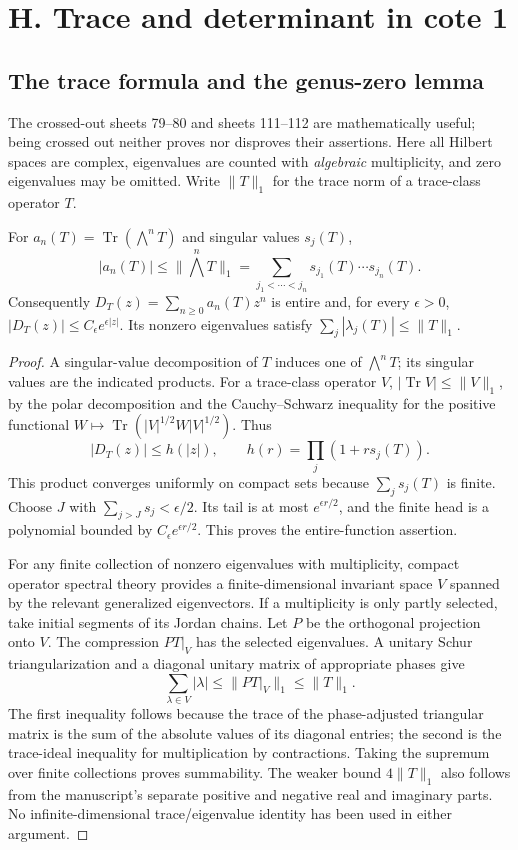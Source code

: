 \section{H. Trace and determinant in cote 1}
\label{sec:geometry-H}

\subsection{The trace formula and the genus-zero lemma}
The crossed-out sheets 79--80 and sheets 111--112 are mathematically useful;
being crossed out neither proves nor disproves their assertions. Here all
Hilbert spaces are complex, eigenvalues are counted with \emph{algebraic}
multiplicity, and zero eigenvalues may be omitted. Write $\|T\|_1$ for the
trace norm of a trace-class operator $T$.

\begin{lemma}
\label{geo-H-bounds}
For $a_n(T)=\operatorname{Tr}(\bigwedge^nT)$ and singular values $s_j(T)$,
\[
 |a_n(T)|\leq\|\bigwedge^nT\|_1
   =\sum_{j_1<\cdots<j_n}s_{j_1}(T)\cdots s_{j_n}(T).
\]
Consequently $D_T(z)=\sum_{n\geq0}a_n(T)z^n$ is entire and, for every
$\epsilon>0$, $|D_T(z)|\leq C_\epsilon e^{\epsilon|z|}$. Its nonzero
eigenvalues satisfy $\sum_j|\lambda_j(T)|\leq\|T\|_1$.
\end{lemma}
\begin{proof}
A singular-value decomposition of $T$ induces one of $\bigwedge^nT$; its
singular values are the indicated products. For a trace-class operator $V$,
$|\operatorname{Tr}V|\leq\|V\|_1$, by the polar decomposition and the
Cauchy--Schwarz inequality for the positive functional
$W\mapsto\operatorname{Tr}(|V|^{1/2}W|V|^{1/2})$. Thus
\[
 |D_T(z)|\leq h(|z|),\qquad h(r)=\prod_j(1+rs_j(T)).
\]
This product converges uniformly on compact sets because $\sum_js_j(T)$ is
finite. Choose $J$ with $\sum_{j>J}s_j<\epsilon/2$. Its tail is at most
$e^{\epsilon r/2}$, and the finite head is a polynomial bounded by
$C_\epsilon e^{\epsilon r/2}$. This proves the entire-function assertion.

For any finite collection of nonzero eigenvalues with multiplicity, compact
operator spectral theory provides a finite-dimensional invariant space $V$
spanned by the relevant generalized eigenvectors. If a multiplicity is only
partly selected, take initial segments of its Jordan chains. Let $P$ be the
orthogonal projection onto $V$. The compression $PT|_V$ has the selected
eigenvalues. A unitary Schur triangularization and a diagonal unitary matrix
of appropriate phases give
\[
 \sum_{\lambda\in V}|\lambda|
 \leq\|PT|_V\|_1\leq\|T\|_1.
\]
The first inequality follows because the trace of the phase-adjusted triangular
matrix is the sum of the absolute values of its diagonal entries; the second
is the trace-ideal inequality for multiplication by contractions. Taking the
supremum over finite collections proves summability. The weaker bound
$4\|T\|_1$ also follows from the manuscript's separate positive and negative
real and imaginary parts. No infinite-dimensional trace/eigenvalue identity
has been used in either argument.
\end{proof}

